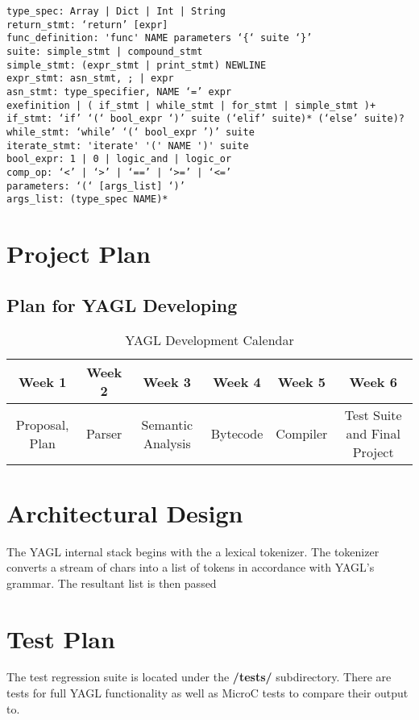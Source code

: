 \documentclass[12pt]{article}
\begin{document}
\begin{lstlisting}
type_spec: Array | Dict | Int | String
return_stmt: ‘return’ [expr]
func_definition: 'func' NAME parameters ‘{‘ suite ‘}’
suite: simple_stmt | compound_stmt
simple_stmt: (expr_stmt | print_stmt) NEWLINE
expr_stmt: asn_stmt, ; | expr 
asn_stmt: type_specifier, NAME ‘=’ expr
exefinition | ( if_stmt | while_stmt | for_stmt | simple_stmt )+
if_stmt: ‘if’ ‘(‘ bool_expr ‘)’ suite (‘elif’ suite)* (‘else’ suite)?
while_stmt: ‘while’ ‘(‘ bool_expr ’)’ suite
iterate_stmt: 'iterate' '(' NAME ')' suite
bool_expr: 1 | 0 | logic_and | logic_or 
comp_op: ‘<’ | ‘>’ | ‘==’ | ‘>=’ | ‘<=’
parameters: ‘(‘ [args_list] ‘)’
args_list: (type_spec NAME)*
\end{lstlisting}

\section{Project Plan}
\subsection{Plan for YAGL Developing }
\begin{table}[H]
\caption{YAGL Development Calendar}
\centering
\begin{tabular}{c c c c c c}

\textbf{Week 1} & \textbf{Week 2} & \textbf{Week 3} & \textbf{Week 4} & \textbf{Week 5} & \textbf{Week 6}\\ [0.5ex] %
\hline
Proposal, Plan&Parser&Semantic Analysis&Bytecode&Compiler&Test Suite and Final Project \\

\hline
\end{tabular}
\end{table}
\section{Architectural Design}
The YAGL internal stack begins with the a lexical tokenizer. The tokenizer converts a stream of chars into a 
list of tokens in accordance with YAGL's grammar. The resultant list is then passed 	
\section{Test Plan}
The test regression suite is located under the \textbf{/tests/} subdirectory. There are tests for full YAGL functionality as well as MicroC tests to compare their output to.\\\\
\end{document}
